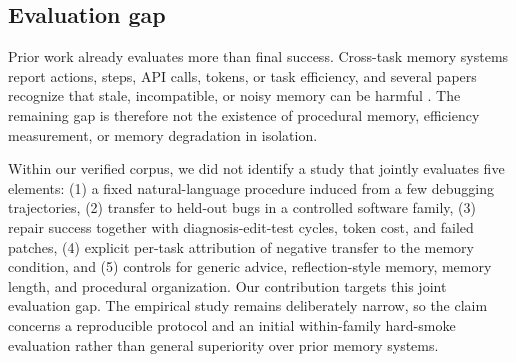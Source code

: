 \subsection{Evaluation gap}
\label{sec:related_gap}

Prior work already evaluates more than final success. Cross-task memory systems report actions, steps, API calls, tokens, or task efficiency, and several papers recognize that stale, incompatible, or noisy memory can be harmful \cite{chen2024automanual,wang2025workflowmemory,fang2026memp,ouyang2026reasoningbank}. The remaining gap is therefore not the existence of procedural memory, efficiency measurement, or memory degradation in isolation.

Within our verified corpus, we did not identify a study that jointly evaluates five elements: (1) a fixed natural-language procedure induced from a few debugging trajectories, (2) transfer to held-out bugs in a controlled software family, (3) repair success together with diagnosis-edit-test cycles, token cost, and failed patches, (4) explicit per-task attribution of negative transfer to the memory condition, and (5) controls for generic advice, reflection-style memory, memory length, and procedural organization. Our contribution targets this joint evaluation gap. The empirical study remains deliberately narrow, so the claim concerns a reproducible protocol and an initial within-family hard-smoke evaluation rather than general superiority over prior memory systems.
